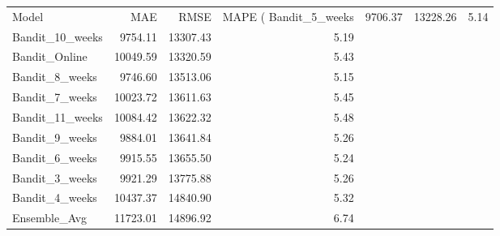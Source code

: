 \begin{tabular}{lrrr}
\toprule
Model & MAE & RMSE & MAPE (%
\midrule
Bandit_5_weeks & 9706.37 & 13228.26 & 5.14 \\
Bandit_10_weeks & 9754.11 & 13307.43 & 5.19 \\
Bandit_Online & 10049.59 & 13320.59 & 5.43 \\
Bandit_8_weeks & 9746.60 & 13513.06 & 5.15 \\
Bandit_7_weeks & 10023.72 & 13611.63 & 5.45 \\
Bandit_11_weeks & 10084.42 & 13622.32 & 5.48 \\
Bandit_9_weeks & 9884.01 & 13641.84 & 5.26 \\
Bandit_6_weeks & 9915.55 & 13655.50 & 5.24 \\
Bandit_3_weeks & 9921.29 & 13775.88 & 5.26 \\
Bandit_4_weeks & 10437.37 & 14840.90 & 5.32 \\
Ensemble_Avg & 11723.01 & 14896.92 & 6.74 \\
\bottomrule
\end{tabular}
